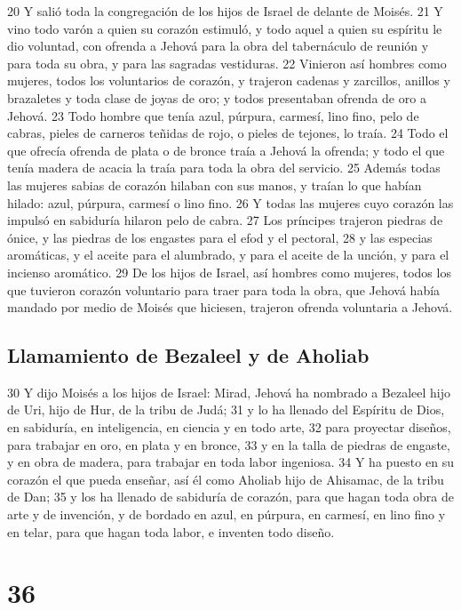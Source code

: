 20 Y salió toda la congregación de los hijos de Israel de delante de Moisés.
21 Y vino todo varón a quien su corazón estimuló, y todo aquel a quien su espíritu le dio voluntad, con ofrenda a Jehová para la obra del tabernáculo de reunión y para toda su obra, y para las sagradas vestiduras.
22 Vinieron así hombres como mujeres, todos los voluntarios de corazón, y trajeron cadenas y zarcillos, anillos y brazaletes y toda clase de joyas de oro; y todos presentaban ofrenda de oro a Jehová.
23 Todo hombre que tenía azul, púrpura, carmesí, lino fino, pelo de cabras, pieles de carneros teñidas de rojo, o pieles de tejones, lo traía.
24 Todo el que ofrecía ofrenda de plata o de bronce traía a Jehová la ofrenda; y todo el que tenía madera de acacia la traía para toda la obra del servicio.
25 Además todas las mujeres sabias de corazón hilaban con sus manos, y traían lo que habían hilado: azul, púrpura, carmesí o lino fino.
26 Y todas las mujeres cuyo corazón las impulsó en sabiduría hilaron pelo de cabra.
27 Los príncipes trajeron piedras de ónice, y las piedras de los engastes para el efod y el pectoral,
28 y las especias aromáticas, y el aceite para el alumbrado, y para el aceite de la unción, y para el incienso aromático.
29 De los hijos de Israel, así hombres como mujeres, todos los que tuvieron corazón voluntario para traer para toda la obra, que Jehová había mandado por medio de Moisés que hiciesen, trajeron ofrenda voluntaria a Jehová.

\section{Llamamiento de Bezaleel y de Aholiab}

30 Y dijo Moisés a los hijos de Israel: Mirad, Jehová ha nombrado a Bezaleel hijo de Uri, hijo de Hur, de la tribu de Judá;
31 y lo ha llenado del Espíritu de Dios, en sabiduría, en inteligencia, en ciencia y en todo arte,
32 para proyectar diseños, para trabajar en oro, en plata y en bronce,
33 y en la talla de piedras de engaste, y en obra de madera, para trabajar en toda labor ingeniosa.
34 Y ha puesto en su corazón el que pueda enseñar, así él como Aholiab hijo de Ahisamac, de la tribu de Dan;
35 y los ha llenado de sabiduría de corazón, para que hagan toda obra de arte y de invención, y de bordado en azul, en púrpura, en carmesí, en lino fino y en telar, para que hagan toda labor, e inventen todo diseño.

\chapter{36}

